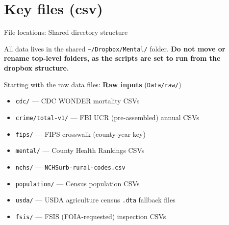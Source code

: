 \documentclass[aspectratio=169]{beamer}
\begin{document}
\section{Key files (csv)}

\begin{frame}{File locations: Shared directory structure}

All data lives in the shared \texttt{\textasciitilde/Dropbox/Mental/} folder. \textbf{Do not move or rename top-level folders, as the scripts are set to run from the dropbox structure.}

\vspace{0.5em}

Starting with the raw data files: 
\textbf{Raw inputs} (\texttt{Data/raw/})
\begin{itemize}\small
    \item \texttt{cdc/} — CDC WONDER mortality CSVs \hyperlink{0c}{}
    \item \texttt{crime/total-v1/} — FBI UCR (pre-assembled) annual CSVs
    \hyperlink{0d}{}
    \item \texttt{fips/} — FIPS crosswalk (county-year key) 
    \item \texttt{mental/} — County Health Rankings CSVs \hyperlink{0c}{}
    \item \texttt{nchs/} — \texttt{NCHSurb-rural-codes.csv} \hyperlink{0e}{}
    \item \texttt{population/} — Census population CSVs \hyperlink{0a}{}
    \item \texttt{usda/} — USDA agriculture census \texttt{.dta} fallback files \hyperlink{0b}{}
    \item \texttt{fsis/} — FSIS (FOIA-requested) inspection CSVs \hyperlink{0f}{}
\end{itemize}

\end{frame}
\end{document}

